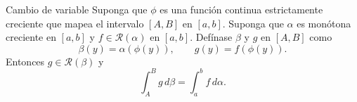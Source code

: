 \documentclass[10pt]{beamer}
\begin{document}
\begin{frame}[allowframebreaks]
\begin{theorem}{Cambio de variable}
Suponga que $\phi$ es una función continua estrictamente creciente que mapea el intervalo $[A, B]$ en $[a, b]$. Suponga que $\alpha$ es monótona creciente en $[a, b]$ y $f \in \mathcal{R}(\alpha)$ en $[a, b]$. Defínase $\beta$ y $g$ en $[A, B]$ como
\begin{equation}
	\beta(y) = \alpha(\phi(y)), \qquad g(y) = f(\phi(y)).
\end{equation}
Entonces $g \in \mathcal{R}(\beta)$ y
\begin{equation}
	\int_A^B g\,d\beta = \int_a^b f\,d\alpha.
\end{equation}
\end{theorem}

\end{frame}
\end{document}
